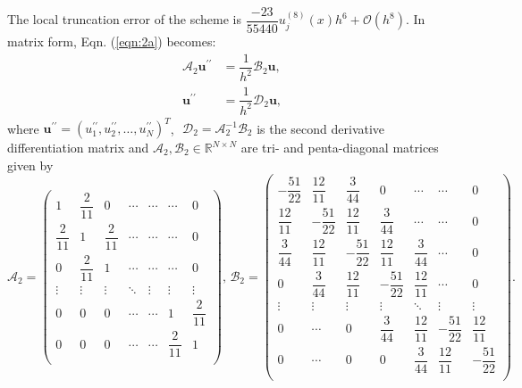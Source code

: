 \documentclass[11pt,a4paper]{amsart}
\theoremstyle{plain}
\theoremstyle{definition}
\theoremstyle{remark}
\numberwithin{equation}{section}
\begin{document}
The local truncation error of the scheme is $\dfrac{-23}{55440} u_j^{(8)}(x) h^6 + \mathcal{O}(h^{8})$. In matrix form, Eqn. (\ref{eqn:2a}) becomes:
\begin{equation}\label{eqn:SD}
\begin{split}
   \mathcal{A}_2 \mathbf{u^{\prime\prime}} &= \dfrac{1}{h^2} \mathcal{B}_2 \mathbf{u}, \\
   \mathbf{u}^{\prime\prime} &= \dfrac{1}{h^2} \mathcal{D}_2 \mathbf{u}, 
\end{split}
\end{equation}
where $ \mathbf{u}^{\prime\prime} = (u^{\prime\prime}_1, u^{\prime\prime}_2, \dots, u^{\prime\prime}_N)^T $,\,\, $ \mathcal{D}_2 = \mathcal{A}_2^{-1} \mathcal{B}_2 $ is the second derivative differentiation matrix and $ \mathcal{A}_2, \mathcal{B}_2 \in \mathbb{R}^{N \times N} $ are tri- and penta-diagonal matrices given by
\begin{equation} 
\mathcal{A}_2 = 
\begin{pmatrix}
1 & \dfrac{2}{11} & 0 & \cdots & \cdots & \cdots & 0 \\[0.3cm]
\dfrac{2}{11} & 1 & \dfrac{2}{11} & \cdots & \cdots & \cdots & 0 \\[0.3cm]
0 & \dfrac{2}{11} & 1 & \cdots & \cdots & \cdots & 0 \\[0.3cm]
\vdots & \vdots & \vdots & \ddots & \vdots & \vdots & \vdots \\[0.3cm]
0 & 0 & 0 & \cdots & \cdots & 1 & \dfrac{2}{11} \\[0.3cm]
0 & 0 & 0 & \cdots & \cdots & \dfrac{2}{11} & 1 \\
\end{pmatrix}
, \, \mathcal{B}_2 =
\begin{pmatrix}
-\dfrac{51}{22} & \dfrac{12}{11} & \dfrac{3}{44} & 0 & \cdots & \cdots & 0 \\[0.3cm]
\dfrac{12}{11} & -\dfrac{51}{22} & \dfrac{12}{11} & \dfrac{3}{44} & \cdots & \cdots & 0 \\[0.3cm]
\dfrac{3}{44} & \dfrac{12}{11} & -\dfrac{51}{22} & \dfrac{12}{11} & \dfrac{3}{44} & \cdots & 0 \\[0.3cm]
0 & \dfrac{3}{44} & \dfrac{12}{11} & -\dfrac{51}{22} & \dfrac{12}{11} & \cdots & 0 \\[0.3cm]
\vdots & \vdots & \vdots & \vdots & \ddots & \vdots & \vdots \\[0.3cm]
0 & \cdots & 0 & \dfrac{3}{44} & \dfrac{12}{11} & -\dfrac{51}{22} & \dfrac{12}{11} \\[0.3cm]
0 & \cdots & 0 & 0 & \dfrac{3}{44} & \dfrac{12}{11} & -\dfrac{51}{22} \\
\end{pmatrix}.
\end{equation}
\end{document}
